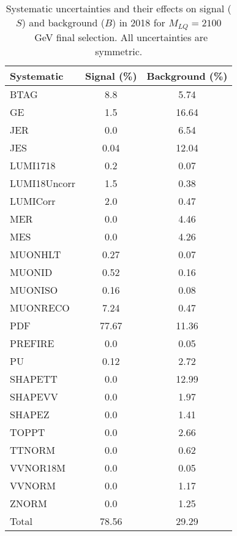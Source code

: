 \begin{table}[htbp]
\begin{center}
\caption{Systematic uncertainties and their effects on signal ($S$) and background ($B$) in 2018 for $M_{LQ}=2100$~GeV final selection. All uncertainties are symmetric.}
\begin{tabular}{lcc}
\hline\hline
Systematic & Signal (\%) & Background (\%) \\ \hline 
BTAG & 8.8 & 5.74\\ 
GE & 1.5 & 16.64\\ 
JER & 0.0 & 6.54\\ 
JES & 0.04 & 12.04\\ 
LUMI1718 & 0.2 & 0.07\\ 
LUMI18Uncorr & 1.5 & 0.38\\ 
LUMICorr & 2.0 & 0.47\\ 
MER & 0.0 & 4.46\\ 
MES & 0.0 & 4.26\\ 
MUONHLT & 0.27 & 0.07\\ 
MUONID & 0.52 & 0.16\\ 
MUONISO & 0.16 & 0.08\\ 
MUONRECO & 7.24 & 0.47\\ 
PDF & 77.67 & 11.36\\ 
PREFIRE & 0.0 & 0.05\\ 
PU & 0.12 & 2.72\\ 
SHAPETT & 0.0 & 12.99\\ 
SHAPEVV & 0.0 & 1.97\\ 
SHAPEZ & 0.0 & 1.41\\ 
TOPPT & 0.0 & 2.66\\ 
TTNORM & 0.0 & 0.62\\ 
VVNOR18M & 0.0 & 0.05\\ 
VVNORM & 0.0 & 1.17\\ 
ZNORM & 0.0 & 1.25\\ 
Total & 78.56 & 29.29\\ \hline \hline
\end{tabular}
\label{tab:SysUncertainties_uujj_2100}
\end{center}
\end{table}

